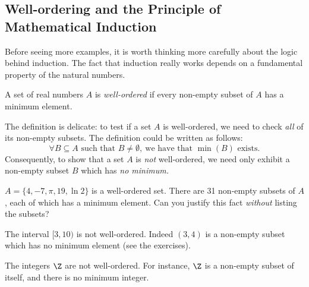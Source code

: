 \begin{enumerate}
\end{enumerate}
\newpage


\subsection{Well-ordering and the Principle of Mathematical Induction}\label{sec:wellorder}

Before seeing more examples, it is worth thinking more carefully about the logic behind induction. The fact that induction really works depends on a fundamental property of the natural numbers.

\begin{defn}\label{defn:wellorder}
A set of real numbers $A$ is \emph{well-ordered} if every non-empty subset of $A$ has a minimum element.
\end{defn}

\noindent The definition is delicate: to test if a set $A$ is well-ordered, we need to check \emph{all} of its non-empty subsets. The definition could be written as follows:
\[\forall B\subseteq A\text{ such that }B\neq\emptyset,\ \text{we have that $\min(B)$ exists.}\]
Consequently, to show that a set $A$ is \emph{not} well-ordered, we need only exhibit a non-empty subset $B$ which has \emph{no minimum.}

\begin{examples}
  \item $A=\{4,-7,\pi,19,\ln 2\}$ is a well-ordered set. There are 31 non-empty subsets of $A$, each of which has a minimum element. Can you justify this fact \emph{without} listing the subsets?
  \item The interval $[3,10)$ is not well-ordered. Indeed $(3,4)$ is a non-empty subset which has no minimum element (see the exercises).
  \item The integers $\Z$ are not well-ordered. For instance, $\Z$ is a non-empty subset of itself, and there is no minimum integer.
\end{examples}

